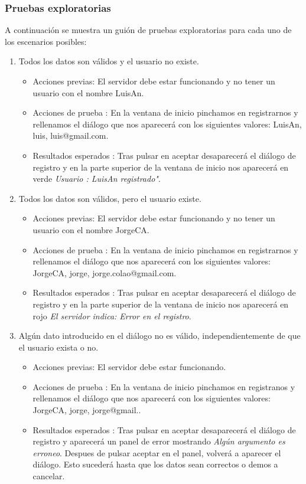 \subsubsection{Pruebas exploratorias}

A continuación se muestra un guión de pruebas exploratorias para cada uno de los escenarios posibles:
\begin{enumerate} 
\item Todos los datos son válidos y el usuario no existe.
	\begin{itemize}
	\item Acciones previas: El servidor debe estar funcionando y no tener un usuario con el nombre LuisAn.
	\item Acciones de prueba : En la ventana de inicio pinchamos en registrarnos y rellenamos el diálogo que nos aparecerá con los siguientes valores: LuisAn, luis, luis@gmail.com.
	\item Resultados esperados : Tras pulsar en aceptar  desaparecerá el diálogo de registro y en la parte superior de la ventana de inicio nos aparecerá en verde \emph {Usuario : LuisAn registrado"}.
	\end{itemize}
\item Todos los datos son válidos, pero el usuario existe.
	\begin{itemize}
	\item Acciones previas: El servidor debe estar funcionando y no tener un usuario con el nombre JorgeCA.
	\item Acciones de prueba : En la ventana de inicio pinchamos en registrarnos y rellenamos el diálogo que nos aparecerá con los siguientes valores: JorgeCA, jorge, jorge.colao@gmail.com.
	\item Resultados esperados : Tras pulsar en aceptar desaparecerá el diálogo de registro y en la parte superior de la ventana de inicio nos aparecerá en rojo \emph {El servidor indica: Error en el registro}.
	\end{itemize}

\item Algún dato introducido en el diálogo no es válido, independientemente de que el usuario exista o no.
	\begin{itemize}
	\item Acciones previas: El servidor debe estar funcionando.
	\item Acciones de prueba : En la ventana de inicio pinchamos en registranos y rellenamos el diálogo que nos aparecerá con los siguientes valores: JorgeCA, jorge, jorge@gmail..
	\item Resultados esperados : Tras pulsar en aceptar desaparecerá el diálogo de registro y aparecerá un panel de error mostrando \emph{Algún argumento es erroneo}. Despues de pulsar aceptar en el panel, volverá a aparecer el diálogo. Esto sucederá hasta que los datos sean correctos o demos a cancelar.  
	\end{itemize}
\end{enumerate} 
